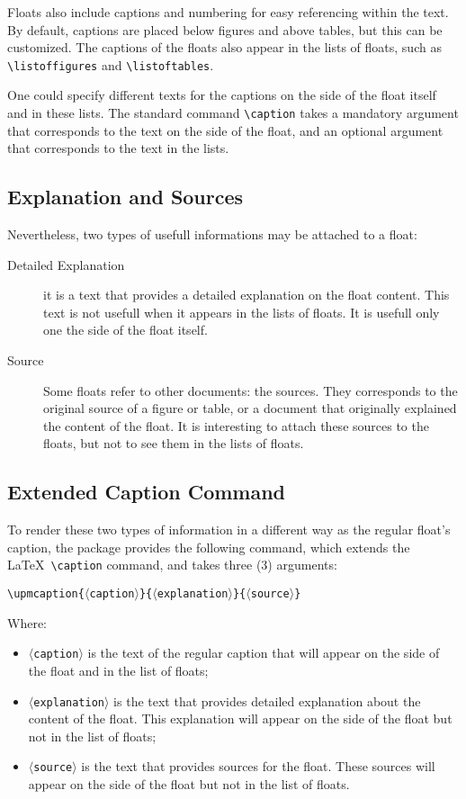 \documentclass[book,taskpackage,specpackage,codepackage]{upmethodology-document}
\begin{document}
Floats also include captions and numbering for easy referencing within the text. By default, captions are placed below figures and above tables, but this can be customized. 
The captions of the floats also appear in the lists of floats, such as \texttt{{\textbackslash}listoffigures} and \texttt{{\textbackslash}listoftables}.

One could specify different texts for the captions on the side of the float itself and in these lists. The standard command \texttt{{\textbackslash}caption} takes a mandatory argument that corresponds to the text on the side of the float, and an optional argument that corresponds to the text in the lists.

\subsection{Explanation and Sources}

Nevertheless, two types of usefull informations may be attached to a float:
\begin{description}
	\item[Detailed Explanation] it is a text that provides a detailed explanation on the float content. This text is not usefull when it appears in the lists of floats. It is usefull only one the side of the float itself.
	\item[Source] Some floats refer to other documents: the sources. They corresponds to the original source of a figure or table, or a document that originally explained the content of the float. It is interesting to attach these sources to the floats, but not to see them in the lists of floats.
\end{description}

\subsection{Extended Caption Command}

To render these two types of information in a different way as the regular float's caption, the package provides the following command, which extends the \LaTeX\ \texttt{{\textbackslash}caption} command, and takes three (3) arguments:

\texttt{{\textbackslash}upmcaption\{$\langle$caption$\rangle$\}\{$\langle$explanation$\rangle$\}\{$\langle$source$\rangle$\}}

Where:
\begin{itemize}
\item \texttt{$\langle$caption$\rangle$} is the text of the regular caption that will appear on the side of the float and in the list of floats;
\item \texttt{$\langle$explanation$\rangle$} is the text that provides detailed explanation about the content of the float. This explanation will appear on the side of the float but not in the list of floats;
\item \texttt{$\langle$source$\rangle$} is the text that provides sources for the float. These sources will appear on the side of the float but not in the list of floats.
\end{itemize}
\end{document}
